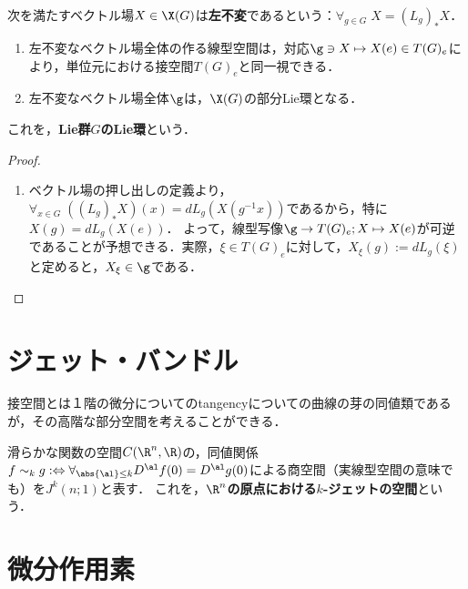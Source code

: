 \documentclass[uplatex,dvipdfmx]{jsreport}
\begin{document}
\begin{definition}
    次を満たすベクトル場$X\in\X(G)$は\textbf{左不変}であるという：$\forall_{g\in G}\;X=(L_g)_*X$．
\end{definition}

\begin{theorem}\mbox{}
    \begin{enumerate}
        \item 左不変なベクトル場全体の作る線型空間は，対応$\g\ni X\mapsto X(e)\in T(G)_e$により，単位元における接空間$T(G)_e$と同一視できる．
        \item 左不変なベクトル場全体$\g$は，$\X(G)$の部分Lie環となる．
    \end{enumerate}
    これを，\textbf{Lie群$G$のLie環}という．
\end{theorem}
\begin{proof}\mbox{}
    \begin{enumerate}
        \item ベクトル場の押し出しの定義より，$\forall_{x\in G}\;((L_g)_*X)(x)=dL_g(X(g^{-1}x))$であるから，特に$X(g)=dL_g(X(e))$．
        よって，線型写像$\g\to T(G)_e;X\mapsto X(e)$が可逆であることが予想できる．実際，$\xi\in T(G)_e$に対して，$X_\xi(g):=dL_g(\xi)$と定めると，$X_\xi\in\g$である．
    \end{enumerate}
\end{proof}

\section{ジェット・バンドル}

\begin{tcolorbox}[colframe=ForestGreen, colback=ForestGreen!10!white,breakable,colbacktitle=ForestGreen!40!white,coltitle=black,fonttitle=\bfseries\sffamily,
title=]
    接空間とは１階の微分についてのtangencyについての曲線の芽の同値類であるが，その高階な部分空間を考えることができる．
\end{tcolorbox}

\begin{definition}
    滑らかな関数の空間$C(\R^n,\R)$の，同値関係$f\sim_kg:\Leftrightarrow \forall_{\abs{\al}\le k}D^\al f(0)=D^\al g(0)$による商空間（実線型空間の意味でも）を$J^k(n;1)$と表す．
    これを，\textbf{$\R^n$の原点における$k$-ジェットの空間}という．
\end{definition}

\section{微分作用素}
\end{document}
